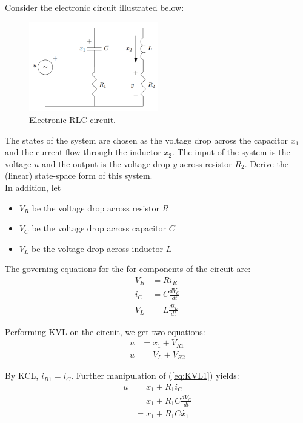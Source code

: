 \section{}
Consider the electronic circuit illustrated below:

\begin{figure}[h]
    \centering
    \includegraphics[width=0.5\textwidth]{Questions/Figures/Q3ProblemDiagram.png}
    \caption{Electronic RLC circuit.}
    \label{fig:Q3 System}
\end{figure}
\FloatBarrier
The states of the system are chosen as the voltage drop across the capacitor $x_1$ and the current flow 
through the inductor $x_2$. The input of the system is the voltage $u$ and the output is the voltage drop 
$y$ across resistor $R_2$. Derive the (linear) state-space form of this system.\\

In addition, let 
\begin{itemize}
    \item $V_{R}$ be the voltage drop across resistor $R$
    \item $V_{C}$ be the voltage drop across capacitor $C$
    \item $V_{L}$ be the voltage drop across inductor $L$
\end{itemize}

The governing equations for the for components of the circuit are:
\begin{align}
    V_{R} &= R i_R \\
    i_{C} &= C \frac{dV_{C}}{dt} \\
    V_{L} &= L \frac{di_{L}}{dt}
\end{align}

Performing KVL on the circuit, we get two equations:
\begin{align}
    u &= x_1 + V_{R1} \label{eq:KVL1} \\
    u &= V_{L} + V_{R2} \label{eq:KVL2}
\end{align}

By KCL, $i_{R1} = i_{C}$. Further manipulation of (\ref{eq:KVL1}) yields:
\begin{align}
    u   &= x_1 + R_{1}i_{C} \\
        &= x_1 + R_{1}C \frac{dV_{C}}{dt} \\
        &= x_1 + R_{1}C \dot{x_1}
\end{align}

